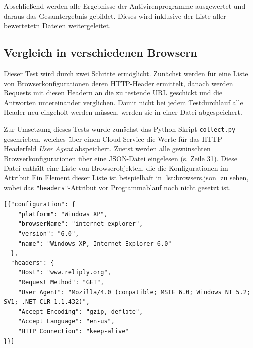 Abschließend werden alle Ergebnisse der Antivirenprogramme ausgewertet und daraus das Gesamtergebnis gebildet. Dieses wird inklusive der Liste aller bewertetetn Dateien weitergeleitet.

\subsection{Vergleich in verschiedenen Browsern}

Dieser Test wird durch zwei Schritte ermöglicht.
Zunächst werden für eine Liste von Browserkonfigurationen deren \ac{HTTP}-Header ermittelt, danach werden Requests mit diesen Headern an die zu testende \ac{URL} geschickt und die Antworten untereinander verglichen.
Damit nicht bei jedem Testdurchlauf alle Header neu eingeholt werden müssen, werden sie in einer Datei abgespeichert.

Zur Umsetzung dieses Tests wurde zunächst das Python-Skript \lstinline{collect.py} geschrieben, welches über einen Cloud-Service die Werte für das \ac{HTTP}-Headerfeld \textit{User Agent} abspeichert.
Zuerst werden alle gewünschten Browserkonfigurationen über eine \ac{JSON}-Datei eingelesen (s. Zeile 31).
Diese Datei enthält eine Liste von Browserobjekten, die die Konfigurationen im Attribut 
Ein Element dieser Liste ist beispielhaft in \autoref{lst:browsers.json} zu sehen, wobei das \lstinline{"headers"}-Attribut vor Programmablauf noch nicht gesetzt ist.

\begin{scriptsize}
\begin{lstlisting}
[{"configuration": {
    "platform": "Windows XP",
    "browserName": "internet explorer",
    "version": "6.0",
    "name": "Windows XP, Internet Explorer 6.0"
  },
  "headers": {
    "Host": "www.reliply.org",
    "Request Method": "GET",
    "User Agent": "Mozilla/4.0 (compatible; MSIE 6.0; Windows NT 5.2; SV1; .NET CLR 1.1.432)",
    "Accept Encoding": "gzip, deflate",
    "Accept Language": "en-us",
    "HTTP Connection": "keep-alive"
}}]
\end{lstlisting}
\end{scriptsize}

